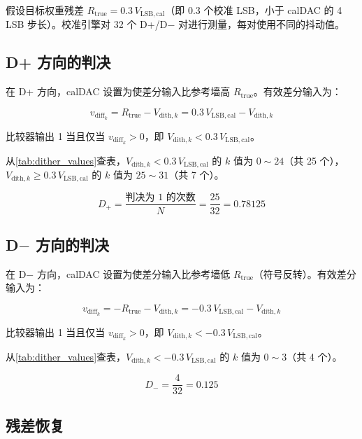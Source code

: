 \documentclass[UTF8,a4paper,11pt]{ctexart}
\newcommand{\Vlsb}{V_{\mathrm{LSB,cal}}}
\newcommand{\vdiff}{v_{\mathrm{diff}}}
\begin{document}
假设目标权重残差 $R_{\mathrm{true}} = 0.3\,\Vlsb$（即 0.3 个校准 LSB，小于 calDAC 的 4 LSB 步长）。校准引擎对 32 个 D+/D$-$ 对进行测量，每对使用不同的抖动值。

\subsection{D+ 方向的判决}

在 D+ 方向，calDAC 设置为使差分输入比参考墙高 $R_{\mathrm{true}}$。有效差分输入为：

\begin{equation}
\vdiff_k = R_{\mathrm{true}} - V_{\mathrm{dith},k} = 0.3\,\Vlsb - V_{\mathrm{dith},k}
\end{equation}

比较器输出 1 当且仅当 $\vdiff_k > 0$，即 $V_{\mathrm{dith},k} < 0.3\,\Vlsb$。

从\cref{tab:dither_values}查表，$V_{\mathrm{dith},k} < 0.3\,\Vlsb$ 的 $k$ 值为 $0 \sim 24$（共 25 个），$V_{\mathrm{dith},k} \geq 0.3\,\Vlsb$ 的 $k$ 值为 $25 \sim 31$（共 7 个）。

\begin{equation}
D_+ = \frac{\text{判决为 1 的次数}}{N} = \frac{25}{32} = 0.78125
\end{equation}

\subsection{D$-$ 方向的判决}

在 D$-$ 方向，calDAC 设置为使差分输入比参考墙低 $R_{\mathrm{true}}$（符号反转）。有效差分输入为：

\begin{equation}
\vdiff_k = -R_{\mathrm{true}} - V_{\mathrm{dith},k} = -0.3\,\Vlsb - V_{\mathrm{dith},k}
\end{equation}

比较器输出 1 当且仅当 $\vdiff_k > 0$，即 $V_{\mathrm{dith},k} < -0.3\,\Vlsb$。

从\cref{tab:dither_values}查表，$V_{\mathrm{dith},k} < -0.3\,\Vlsb$ 的 $k$ 值为 $0 \sim 3$（共 4 个）。

\begin{equation}
D_- = \frac{4}{32} = 0.125
\end{equation}

\subsection{残差恢复}
\end{document}
